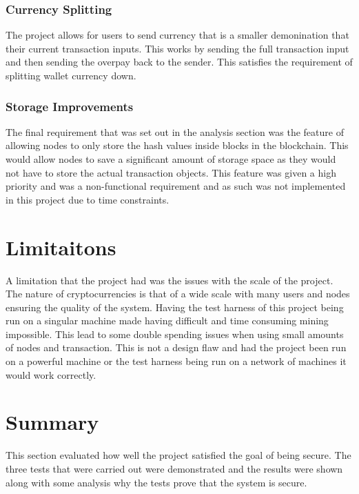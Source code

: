 \documentclass{l4proj}
\begin{document}
\subsubsection{Currency Splitting}
The project allows for users to send currency that is a smaller demonination that their current transaction inputs. This
works by sending the full transaction input and then sending the overpay back to the sender. This satisfies the 
requirement of splitting wallet currency down. 
\subsubsection{Storage Improvements}
The final requirement that was set out in the analysis section was the feature of allowing nodes to only store the
hash values inside blocks in the blockchain. This would allow nodes to save a significant amount of storage space as
they would not have to store the actual transaction objects. This feature was given a high priority and was a 
non-functional requirement and as such was not implemented in this project due to time constraints.

\section{Limitaitons}
A limitation that the project had was the issues with the scale of the project. The nature of cryptocurrencies is
that of a wide scale with many users and nodes ensuring the quality of the system. Having the test harness of this
project being run on a singular machine made having difficult and time consuming mining impossible. This lead to some
double spending issues when using small amounts of nodes and transaction. This is not a design flaw and had the project
been run on a powerful machine or the test harness being run on a network of machines it would work correctly.

\section{Summary}
This section evaluated how well the project satisfied the goal of being secure. The three tests that were carried out
were demonstrated and the results were shown along with some analysis why the tests prove that the system is secure.

\end{document}
